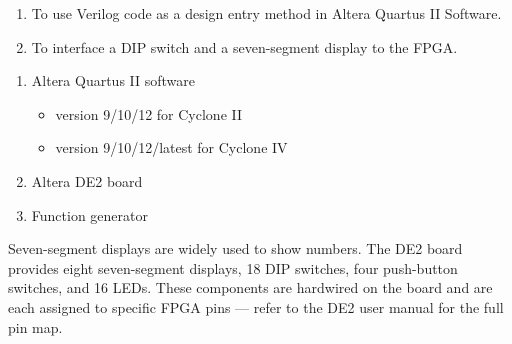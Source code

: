 
\begin{objectives}
  \begin{enumerate}
    \item To use Verilog code as a design entry method in Altera Quartus II Software.
    \item To interface a DIP switch and a seven-segment display to the FPGA.
  \end{enumerate}
\end{objectives}

\begin{equipment}
  \begin{enumerate}
    \item Altera Quartus II software
          \begin{itemize}
            \item version 9/10/12 for Cyclone II
            \item version 9/10/12/latest for Cyclone IV
          \end{itemize}
    \item Altera DE2 board
    \item Function generator
  \end{enumerate}
\end{equipment}

\begin{introduction}
  Seven-segment displays are widely used to show numbers. The DE2 board provides eight seven-segment displays, 18 DIP switches, four push-button switches, and 16 LEDs. These components are hardwired on the board and are each assigned to specific FPGA pins --- refer to the DE2 user manual for the full pin map.
\end{introduction}


